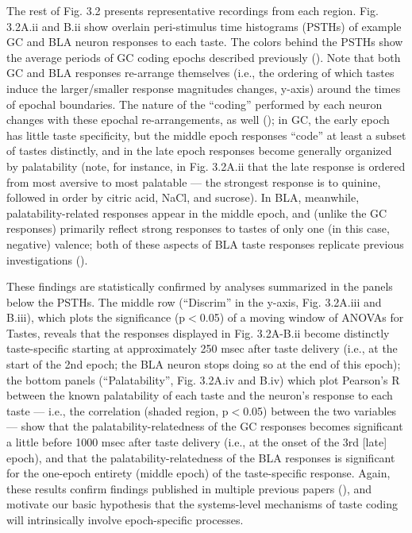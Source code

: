 \begin{refsection}
The rest of Fig. 3.2 presents representative recordings from each region. Fig. 3.2A.ii and B.ii show overlain peri-stimulus time histograms (PSTHs) of example GC and BLA neuron responses to each taste. The colors behind the PSTHs show the average periods of GC coding epochs described previously (\cite{katz2001a,fontanini2009a,sadacca2012a}). Note that both GC and BLA responses re-arrange themselves (i.e., the ordering of which tastes induce the larger/smaller response magnitudes changes, y-axis) around the times of epochal boundaries. The nature of the “coding” performed by each neuron changes with these epochal re-arrangements, as well (\cite{katz2001a,sadacca2012a,moran2014a,li2016a}); in GC, the early epoch has little taste specificity, but the middle epoch responses “code” at least a subset of tastes distinctly, and in the late epoch responses become generally organized by palatability (note, for instance, in Fig. 3.2A.ii that the late response is ordered from most aversive to most palatable --- the strongest response is to quinine, followed in order by citric acid, NaCl, and sucrose). In BLA, meanwhile, palatability-related responses appear in the middle epoch, and (unlike the GC responses) primarily reflect strong responses to tastes of only one (in this case, negative) valence; both of these aspects of BLA taste responses replicate previous investigations (\cite{fontanini2009a}).

These findings are statistically confirmed by analyses summarized in the panels below the PSTHs. The middle row (“Discrim” in the y-axis, Fig. 3.2A.iii and B.iii), which plots the significance (p\(<\)0.05) of a moving window of ANOVAs for Tastes, reveals that the responses displayed in Fig. 3.2A-B.ii become distinctly taste-specific starting at approximately 250 msec after taste delivery (i.e., at the start of the 2nd epoch; the BLA neuron stops doing so at the end of this epoch); the bottom panels (“Palatability”, Fig. 3.2A.iv and B.iv) which plot Pearson’s R between the known palatability of each taste and the neuron’s response to each taste --- i.e., the correlation (shaded region, p\(<\)0.05) between the two variables --- show that the palatability-relatedness of the GC responses becomes significant a little before 1000 msec after taste delivery (i.e., at the onset of the 3rd [late] epoch), and that the palatability-relatedness of the BLA responses is significant for the one-epoch  entirety (middle epoch) of the taste-specific response. Again, these results confirm findings published in multiple previous papers (\cite{katz2001a,grossman2008a,fontanini2009a,sadacca2012a}), and motivate our basic hypothesis that the systems-level mechanisms of taste coding will intrinsically involve epoch-specific processes.


\end{refsection}

